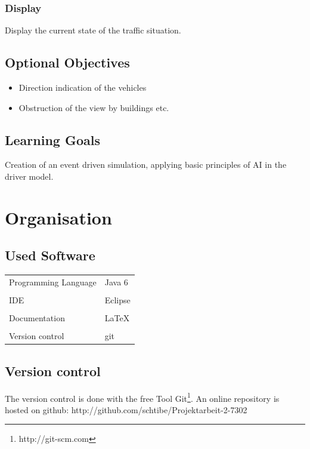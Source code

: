\documentclass[a4paper,10pt,titlepage]{article}
\begin{document}
\subsubsection{Display}

Display the current state of the traffic situation. 
\newpage

\subsection{Optional Objectives}
\begin{itemize}
 \item Direction indication of the vehicles
 \item Obstruction of the view by buildings etc. 
\end{itemize}

\subsection{Learning Goals}

Creation of an event driven simulation, applying basic principles of AI in the driver model.


\section{Organisation}

\subsection{Used Software}
\begin{tabular}{ll}
Programming Language & Java 6 \\
& \\
IDE & Eclipse \\
& \\
Documentation & \LaTeX \\
& \\
Version control & git \\
\end{tabular}

\subsection{Version control}
The version control is done with the free Tool Git\footnote[1]{http://git-scm.com}.
An online repository is hosted on github: \newline
http://github.com/schtibe/Projektarbeit-2-7302
\end{document}
